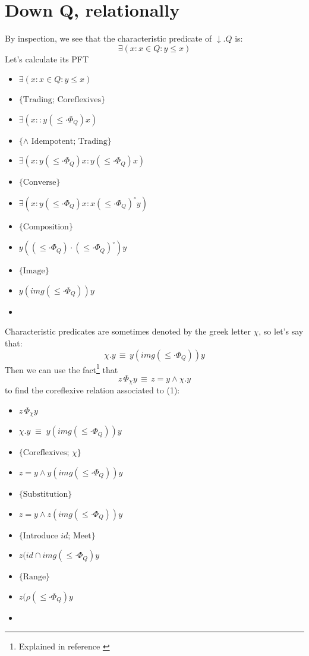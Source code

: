 \documentclass{article}
\begin{document}
\section{Down Q, relationally}
By inspection, we see that the characteristic predicate of $\downarrow.Q$ is:
\begin{equation}
    \exists(x : x \in Q : y \leq x)
\end{equation}
Let's calculate its PFT
\begin{itemize}
    \item $\exists(x : x \in Q : y \leq x)$
    \item[$\equiv$] $\{\text{Trading; Coreflexives}\}$
    \item[] $\exists(x : : y (\leq \cdot \Phi_{Q}) x)$
    \item[$\equiv$] $\{\text{$\wedge$ Idempotent; Trading}\}$
    \item[] $\exists(x : y (\leq \cdot \Phi_{Q}) x : y (\leq \cdot \Phi_{Q}) x)$
    \item[$\equiv$] $\{\text{Converse}\}$
    \item[] $\exists(x : y (\leq \cdot \Phi_{Q}) x : x (\leq \cdot \Phi_{Q})^{\circ} y)$
    \item[$\equiv$] $\{\text{Composition}\}$
    \item[] $y ((\leq \cdot \Phi_{Q}) \cdot (\leq \cdot \Phi_{Q})^{\circ}) y$
    \item[$\equiv$] $\{\text{Image}\}$
    \item[] $y (img(\leq \cdot \Phi_{Q})) y$
    \item[\Heart]
\end{itemize}
Characteristic predicates are sometimes denoted by the greek letter $\chi$, so let's say that:
\begin{equation*}
    \chi.y \,\equiv\, y (img(\leq \cdot \Phi_{Q})) y
\end{equation*}
Then we can use the fact\footnote{Explained in reference \cite{Oliveira2009}} that
\begin{equation*}
    z \,\Phi_{\chi} y \,\equiv\, z = y \wedge \chi. y
\end{equation*}
to find the coreflexive relation associated to (1):
\begin{itemize}
    \item $z \,\Phi_{\chi} y$
    \item[--] $\chi.y \; \equiv \; y(img(\leq \cdot \Phi_{Q})) y$
    \item[$\equiv$] $\{\text{Coreflexives; $\chi$}\}$
    \item[] $z = y \wedge y(img(\leq \cdot \Phi_{Q})) y$
    \item[$\equiv$] $\{\text{Substitution}\}$
    \item[] $z = y \wedge z(img(\leq \cdot \Phi_{Q})) y$
    \item[$\equiv$] $\{\text{Introduce $id$; Meet}\}$
    \item[] $z (id \cap img(\leq \cdot \Phi_{Q}) y$
    \item[$\equiv$] $\{\text{Range}\}$
    \item[] $z (\rho(\leq \cdot \Phi_{Q}) y$
    \item[\Heart]
\end{itemize}
\end{document}
